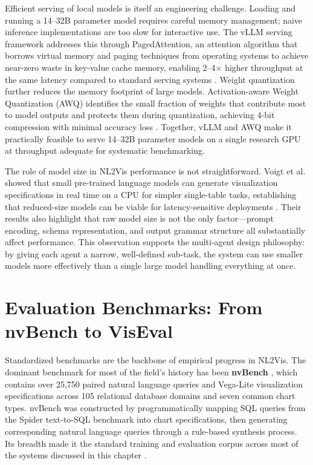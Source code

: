 \documentclass[a4paper,oneside,bibliography=totoc]{scrbook}
\begin{document}
Efficient serving of local models is itself an engineering challenge. Loading and running a 14--32B parameter model requires careful memory management; naive inference implementations are too slow for interactive use. The vLLM serving framework addresses this through PagedAttention, an attention algorithm that borrows virtual memory and paging techniques from operating systems to achieve near-zero waste in key-value cache memory, enabling 2--4$\times$ higher throughput at the same latency compared to standard serving systems \cite{kwon2023vllm}. Weight quantization further reduces the memory footprint of large models. Activation-aware Weight Quantization (AWQ) identifies the small fraction of weights that contribute most to model outputs and protects them during quantization, achieving 4-bit compression with minimal accuracy loss \cite{lin2024awq}. Together, vLLM and AWQ make it practically feasible to serve 14--32B parameter models on a single research GPU at throughput adequate for systematic benchmarking.

The role of model size in NL2Vis performance is not straightforward. Voigt et al. showed that small pre-trained language models can generate visualization specifications in real time on a CPU for simpler single-table tasks, establishing that reduced-size models can be viable for latency-sensitive deployments \cite{voigt2024plots}. Their results also highlight that raw model size is not the only factor---prompt encoding, schema representation, and output grammar structure all substantially affect performance. This observation supports the multi-agent design philosophy: by giving each agent a narrow, well-defined sub-task, the system can use smaller models more effectively than a single large model handling everything at once.

\section{Evaluation Benchmarks: From nvBench to VisEval}
\label{sec:benchmarks}

Standardized benchmarks are the backbone of empirical progress in NL2Vis. The dominant benchmark for most of the field's history has been \textbf{nvBench} \cite{luo2021nvbench}, which contains over 25{,}750 paired natural language queries and Vega-Lite visualization specifications across 105 relational database domains and seven common chart types. nvBench was constructed by programmatically mapping SQL queries from the Spider text-to-SQL benchmark \cite{yu2018spider} into chart specifications, then generating corresponding natural language queries through a rule-based synthesis process. Its breadth made it the standard training and evaluation corpus across most of the systems discussed in this chapter \cite{luo2022ncnet,li2025prompt4vis,maddigan2023chat2vis}.
\end{document}
